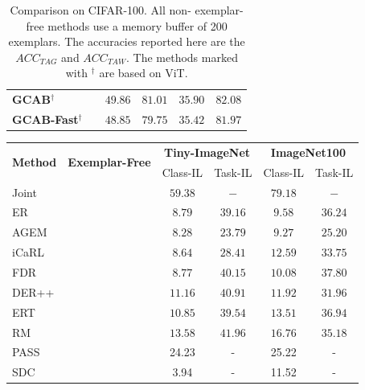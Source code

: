 \documentclass[twocolumn]{svjour3}          %
\newcommand{\cmark}{\ding{51}}%
\newcommand{\xmark}{\ding{55}}%
\begin{document}
\begin{table}[tb]
\begin{tabular}{lccccc}
    \hline
    \textbf{GCAB}$^{\dag}$ & \cmark& $\mathbf{49.86 }$ & $\mathbf{81.01 }$ & $\mathbf{35.90 }$ & $\mathbf{82.08 }$ 
    \\
    \textbf{GCAB-Fast}$^{\dag}$ & \cmark & ${48.85 }$ & ${79.75 }$ & ${35.42 }$ & ${81.97 }$ 
    \\
    \hline
  \end{tabular}
\caption{Comparison on CIFAR-100. All non- exemplar-free methods use a memory buffer of 200 exemplars. The accuracies reported here are the $ACC_{TAG}$ and $ACC_{TAW}$. The methods marked with $^{\dag}$ are based on ViT.}
\label{tab:200_cifar}
\end{table}

\begin{table}[tb]
\centering
  \begin{tabular}{lccccc}
    \hline
    \multirow{2}{*}{\textbf{Method}}
    &\multirow{2}{*}{\textbf{Exemplar-Free}}
    &\multicolumn{2}{c}{\textbf{Tiny-ImageNet}}
    &\multicolumn{2}{c}{\textbf{ImageNet100}}\\ 
    & &Class-IL &Task-IL&Class-IL &Task-IL \\
    \hline
    Joint& \cmark& $59.38$ & $-$ & $79.18$ & $-$\\
    \hline
    ER \hfill \citep{riemer2018learning}   & \xmark
    &\phantom{0}$8.79$  &$39.16$& \phantom{0}$9.58$ & $36.24$
     \\
    AGEM \hfill \citep{chaudhry2018efficient} & \xmark 
    &\phantom{0}$8.28$  &$23.79$& \phantom{0}$9.27$ & $25.20$ 
     \\
    iCaRL \hfill \citep{rebuffi2017icarl} & \xmark
    &\phantom{0}$8.64$  &$28.41$& $12.59$ & $33.75$ 
     \\
    FDR \hfill \citep{benjamin2018measuring}  & \xmark 
    &\phantom{0}$8.77$  &$40.15$& $10.08$ & $37.80$ 
     \\
    DER++ \hfill \citep{buzzega2020dark} & \xmark 
    &$11.16$ &$40.91$& $11.92$ & $31.96$ 
     \\
    ERT \hfill \citep{buzzega2021rethinking}  & \xmark 
    &$10.85$ &$39.54$& $13.51$ & $36.94$ 
     \\
    RM \hfill \citep{bang2021rainbow}   &\xmark 
    &$13.58$ &$41.96$& $16.76$ & $35.18$ 
     \\
    PASS \hfill \citep{zhu2021prototype}
    & \cmark & 24.23&- &25.22&-\\
    SDC \hfill \citep{yu2020semantic}
    & \cmark& \phantom{0}3.94 & -&11.52 &-\\

\end{tabular}
\end{table}
\end{document}
